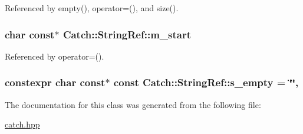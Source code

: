 Referenced by empty(), operator=(), and size().

\hypertarget{class_catch_1_1_string_ref_a0583d4e5ea88c99c121504052a4fcb6c}{
\subsubsection[{m\-\_\-start}]{\setlength{\rightskip}{0pt plus 5cm}char const$\ast$ Catch\-::\-String\-Ref\-::m\-\_\-start\hspace{0.3cm}{\ttfamily [private]}}}\label{class_catch_1_1_string_ref_a0583d4e5ea88c99c121504052a4fcb6c}


Referenced by operator=().

\hypertarget{class_catch_1_1_string_ref_a38d077e89f7f2ce666507ab28dd28653}{
\subsubsection[{s\-\_\-empty}]{\setlength{\rightskip}{0pt plus 5cm}constexpr char const$\ast$ const Catch\-::\-String\-Ref\-::s\-\_\-empty = \char`\"{}\char`\"{}\hspace{0.3cm}{\ttfamily [static]}, {\ttfamily [private]}}}\label{class_catch_1_1_string_ref_a38d077e89f7f2ce666507ab28dd28653}


The documentation for this class was generated from the following file\-:\begin{DoxyCompactItemize}
\item 
\hyperlink{catch_8hpp}{catch.\-hpp}\end{DoxyCompactItemize}
